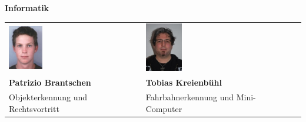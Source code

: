 \newpage
\large
\textbf{Informatik}
\begin{table}[H]
\begin{tabular}{p{}p{}p{}}	
	\includegraphics[width=0.26\textwidth]{./04_Projektmanagement/fig/patriziobrantschen.jpg}	&	
	\includegraphics[width=0.25\textwidth]{./04_Projektmanagement/fig/tobiaskreienbuehl.jpg} 
	\\
	\textbf{Patrizio Brantschen} & 	
	\textbf{Tobias Kreienbühl}
	\\
	Objekterkennung und Rechtsvortritt &
	Fahrbahnerkennung und Mini-Computer
\end{tabular}
\end{table}
\normalsize







